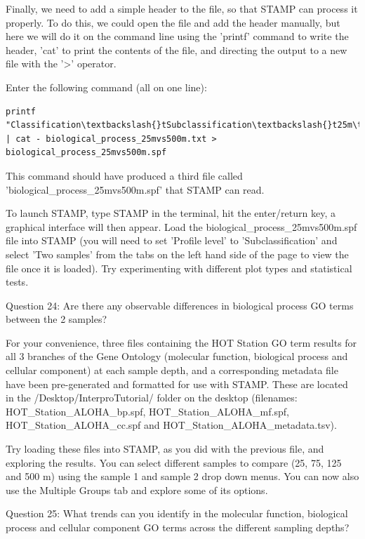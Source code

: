 Finally, we need to add a simple header to the file, so that STAMP can process it properly. To do this, we could open the file and add the header manually, but here we will do it on the command line using the 'printf' command to write the header, 'cat' to print the contents of the file, and directing the output to a new file with the '>' operator.

\begin{steps}
Enter the following command (all on one line):
\begin{lstlisting}
printf "Classification\textbackslash{}tSubclassification\textbackslash{}t25m\textbackslash{}t500m\textbackslash{}n" | cat - biological_process_25mvs500m.txt > biological_process_25mvs500m.spf
\end{lstlisting}
This command should have produced a third file called 'biological\_process\_25mvs500m.spf' that STAMP can read.
\end{steps}

\begin{steps}
To launch STAMP, type STAMP in the terminal, hit the enter/return key, a graphical interface will then appear. Load the biological\_process\_25mvs500m.spf file into STAMP (you will need to set 'Profile level' to 'Subclassification' and select 'Two samples' from the tabs on the left hand side of the page to view the file once it is loaded). Try experimenting with different plot types and statistical tests.

Question 24: Are there any observable differences in biological process GO terms between the 2 samples?
\end{steps}

For your convenience, three files containing the HOT Station GO term results for all 3 branches of the Gene Ontology (molecular function, biological process and cellular component) at each sample depth, and a corresponding metadata file have been pre-generated and formatted for use with STAMP. These are located in the /Desktop/InterproTutorial/ folder on the desktop (filenames: HOT\_Station\_ALOHA\_bp.spf, HOT\_Station\_ALOHA\_mf.spf, HOT\_Station\_ALOHA\_cc.spf and HOT\_Station\_ALOHA\_metadata.tsv). 

\begin{steps}
Try loading these files into STAMP, as you did with the previous file, and exploring the results. You can select different samples to compare (25, 75, 125 and 500 m) using the sample 1 and sample 2 drop down menus. You can now also use the Multiple Groups tab and explore some of its options.
  
Question 25: What trends can you identify in the molecular function, biological process and cellular component GO terms across the different sampling depths?
\end{steps}
